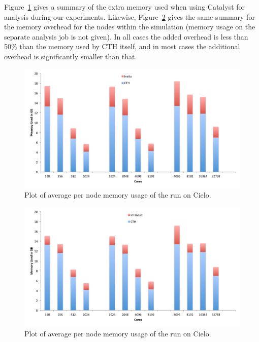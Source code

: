 Figure~\ref{fig:MemoryInSituPerNode} gives a summary of the extra memory
used when using Catalyst for \insitu analysis during our experiments.
Likewise, Figure~\ref{fig:MemoryInTransitPerNode} gives the same summary
for the \intransit memory overhead for the nodes within the simulation
(memory usage on the separate analysis job is not given).  In all cases the
added overhead is less than 50\% than the memory used by CTH itself, and in
most cases the additional overhead is significantly smaller than that.

\begin{figure}[htb]
  \centering
  \includegraphics[width=\linewidth]{figures/MemoryUsageInSituPerNode}
  \caption{Plot of average per node memory usage of the \insitu run on Cielo.}
  \label{fig:MemoryInSituPerNode}
\end{figure}

\begin{figure}[htb]
  \centering
  \includegraphics[width=\linewidth]{figures/MemoryUsageInTransitPerNode}
  \caption{Plot of average per node memory usage of the \intransit run on Cielo.}
  \label{fig:MemoryInTransitPerNode}
\end{figure}

